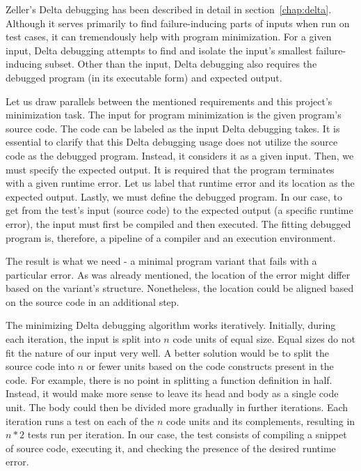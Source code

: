 Zeller's Delta debugging \cite{Zeller99, Zeller02, Zeller01} has been 
described in detail in section~\ref{chap:delta}.
Although it serves primarily to find failure-inducing parts of inputs when 
run on test cases, it can tremendously help with program minimization.
For a given input, Delta debugging attempts to find and isolate the input's 
smallest failure-inducing subset.
Other than the input, Delta debugging also requires the debugged program 
(in its executable form) and expected output.

Let us draw parallels between the mentioned requirements and this project's 
minimization task.
The input for program minimization is the given program's source code.
The code can be labeled as the input Delta debugging takes.
It is essential to clarify that this Delta debugging usage does not utilize 
the source code as the debugged program.
Instead, it considers it as a given input.
Then, we must specify the expected output.
It is required that the program terminates with a given runtime error.
Let us label that runtime error and its location as the expected output.
Lastly, we must define the debugged program.
In our case, to get from the test's input (source code) to the expected 
output (a specific runtime error), the input must first be compiled 
and then executed.
The fitting debugged program is, therefore, a pipeline of a compiler and 
an execution environment.

The result is what we need - a minimal program variant that fails with 
a particular error.
As was already mentioned, the location of the error might differ based 
on the variant's structure.
Nonetheless, the location could be aligned based on the source code in 
an additional step.


The minimizing Delta debugging algorithm works iteratively.
Initially, during each iteration, the input is split into $n$ code units 
of equal size.
Equal sizes do not fit the nature of our input very well.
A better solution would be to split the source code into $n$ or fewer units 
based on the code constructs present in the code.
For example, there is no point in splitting a function definition in half.
Instead, it would make more sense to leave its head and body as a single 
code unit.
The body could then be divided more gradually in further iterations.
Each iteration runs a test on each of the $n$ code units and its 
complements, resulting in $n * 2$ tests run per iteration.
In our case, the test consists of compiling a snippet of 
source code, executing it, and checking the presence of the desired runtime
error.

